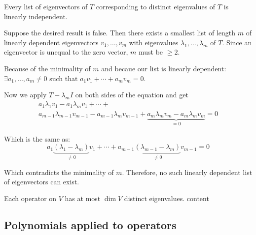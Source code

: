 \setcounter{thm}{10}
\begin{thm}
  Every list of eigenvectors of $T$ corresponding to distinct eigenvalues of $T$ is linearly independent.
\end{thm}
\begin{prf}
  Suppose the desired result is false. Then there exists a smallest list of length $m$ of linearly dependent eigenvectors $v_1, \dots, v_m$ with eigenvalues $\lambda_1, \dots, \lambda_m$ of $T$. Since an eigenvector is unequal to the zero vector, $m$ must be $\geq 2$.

  Because of the minimality of $m$ and becaue our list is linearly dependent: $\exists a_1, \dots, a_m \neq 0$ such that $a_1 v_1 + \cdots + a_m v_m = 0$. 
  
  Now we apply $T-\lambda_m I$ on both sides of the equation and get
  \begin{equation}
    \begin{gathered}
      a_1 \lambda_1 v_1 - a_1 \lambda_m v_1
      + \cdots + \\
      a_{m-1} \lambda_{m-1} v_{m-1} - a_{m-1} \lambda_{m} v_{m-1} +
      \underbrace{a_m \lambda_m v_m -a_m \lambda_m v_m}_{=0} =0
    \end{gathered}
  \end{equation}

  Which is the same as:
  \begin{equation}
    a_1 \underbrace{(\lambda_1 - \lambda_m)}_{\neq 0} v_1 + \cdots + a_{m-1} \underbrace{(\lambda_{m-1}-\lambda_{m})}_{\neq 0} v_{m-1}=0
  \end{equation}

  Which contradicts the minimality of $m$. Therefore, no such linearly dependent list of eigenvectors can exist.
  
\end{prf}

\begin{thm}
  Each operator on $V$ has at most $\dim V$ distinct eigenvalues.
  content
\end{thm}

\paragraph{}

\subsection{Polynomials applied to operators}

